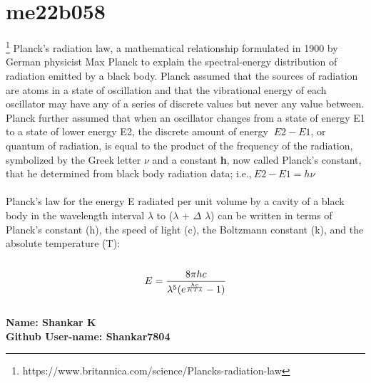 \section{me22b058}
\footnote{https://www.britannica.com/science/Plancks-radiation-law}
Planck’s radiation law, a mathematical relationship formulated in 1900 by German physicist Max Planck to explain the spectral-energy distribution of radiation emitted by a black body.
Planck assumed that the sources of radiation are atoms in a state of oscillation and that the vibrational energy of each oscillator may have any of a series of discrete values but never any value between. Planck further assumed that when an oscillator changes from a state of energy E1 to a state of lower energy E2, the discrete amount of energy \(\ E2-E1\), or quantum of radiation, is equal to the product of the frequency of the radiation, symbolized by the Greek letter {\(\nu\)} and a constant \textbf{h}, now called Planck’s constant, that he determined from black body radiation data; i.e.,\(\ E2-E1=h\nu\)\\
\\
Planck’s law for the energy E radiated per unit volume by a cavity of a black body in the wavelength interval \(\lambda\) to (\(\lambda\) + \(\Delta\) \(\lambda\))  can be written in terms of Planck’s constant (h), the speed of light (c), the Boltzmann constant (k), and the absolute temperature (T):\\
\\
\begin{equation}
  \huge{  E = \frac{8\pi hc}{\lambda^5(e^\frac{hc}{KT\lambda} -1)}}
\end{equation}
\\
\textbf{Name: Shankar K}\\
\textbf{Github User-name: Shankar7804}


